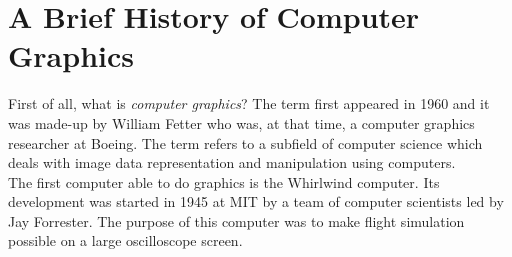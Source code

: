\section{A Brief History of Computer Graphics}
First of all, what is \textit{computer graphics}? The term first appeared in 1960 and it was made-up by William Fetter who was, at that time, a computer graphics researcher at Boeing. The term refers to a subfield of computer science which deals with image data representation and manipulation using computers.\\
The first computer able to do graphics is the Whirlwind computer. Its development was started in 1945 at MIT by a team of computer scientists led by Jay Forrester. The purpose of this computer was to make flight simulation possible on a large oscilloscope screen.\\
